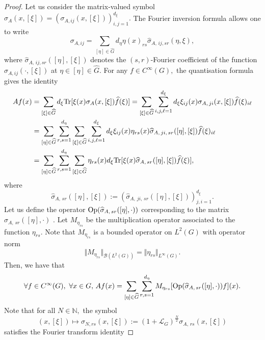 \documentclass[12pt, reqno]{amsart}
\theoremstyle{definition}
\theoremstyle{remark}
\numberwithin{equation}{section}
\begin{document}
\begin{proof}Let us consider the matrix-valued symbol $\sigma_A(x,[\xi])=(\sigma_{A,ij}(x,[\xi]))_{i,j=1}^{d_\xi}.$ The Fourier inversion formula allows one to write
\begin{equation}
    \sigma_{A,ij}=\sum_{[\eta]\in \widehat{G}}d_\eta\eta(x)_{rs}
    \widehat{\sigma}_{A,\,ij,sr}(\eta,\xi),
\end{equation} where $\widehat{\sigma}_{A,\,ij,sr}([\eta],[\xi])$ denotes the $(s,r)$-Fourier coefficient of the function $\sigma_{A,ij}(\cdot,[\xi])$ at $\eta\in [\eta]\in \widehat{G}.$ For any $f\in   C^{\infty}(G),$
the quantisation formula gives the identity
\begin{align*}
    Af(x) &=\sum_{[\xi]\in \widehat{G}}d_\xi\textnormal{Tr}[\xi(x)\sigma_A(x,[\xi])\widehat{f}(\xi)]=\sum_{[\xi]\in \widehat{G}}\sum_{i,j,\ell=1}^{d_\xi}d_\xi\xi_{ij}(x)\sigma_{A,\,ji }(x,[\xi])\widehat{f}(\xi)_{i\ell}\\
    &=\sum_{[\eta]\in \widehat{G}}\sum_{r,s=1}^{d_\eta}\sum_{[\xi]\in \widehat{G}}\sum_{i,j,\ell=1}^{d_\xi}d_\xi \xi_{ij}(x)\eta_{rs}(x)\widehat{\sigma}_{A,\,ji,\,sr }([\eta],[\xi])\widehat{f}(\xi)_{i\ell}\\
    &=\sum_{[\eta]\in \widehat{G}}\sum_{r,s=1}^{d_\eta}\sum_{[\xi]\in \widehat{G}}\eta_{rs}(x)d_\xi\textnormal{Tr}[ \xi(x)\widehat{\sigma}_{A,\,sr }([\eta],[\xi])\widehat{f}(\xi)],
\end{align*}where $$ \widehat{\sigma}_{A,\,sr }([\eta],[\xi]):=(\widehat{\sigma}_{A,\,ji,\,sr }([\eta],[\xi]))_{j,i=1}^{d_\xi}. $$ Let us define the  operator $\textnormal{Op}(\widehat{\sigma}_{A,\,sr }([\eta],\cdot))$ corresponding to the matrix $\widehat{\sigma}_{A,\,sr }([\eta],\cdot)$ . Let $M_{\eta_{rs}}$ be the multiplication operator associated to the function $\eta_{rs}.$ Note that $M_{\eta_{rs}}$ is a bounded operator on $L^2(G)$ with operator norm
\begin{equation}
    \Vert M_{\eta_{rs}}\Vert_{\mathscr{B}(L^2(G))}=\Vert\eta_{rs}\Vert_{L^\infty(G)}.
\end{equation}
Then, we have that
\begin{equation}
 \forall f\in C^{\infty}(G),\,\,\forall x\in G,\,
 Af(x) =\sum_{[\eta]\in \widehat{G}}\sum_{r,s=1}^{d_\eta}M_{\eta_{rs}}[\textnormal{Op}(\widehat{\sigma}_{A,\,sr }([\eta],\cdot ))f](x).
\end{equation}
Note that for all $N\in \mathbb{N},$ the symbol $$(x,[\xi])\mapsto \sigma_{N,rs}(x,[\xi]):=(1+\mathcal{L}_G)^{\frac{N}{2}}\sigma_{A,\,rs}(x,[\xi])$$  satisfies the Fourier transform identity

\end{proof}
\end{document}
